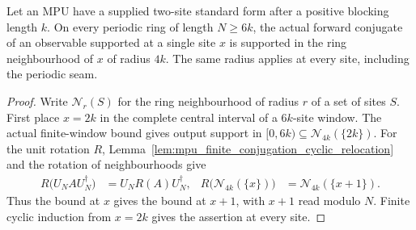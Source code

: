 \begin{lemma}
    \label{lem:mpu_finite_cyclic_singleton_propagation}
    \leanok
    Let an MPU have a supplied two-site standard form after a positive
    blocking length $k$. On every periodic ring of length $N\geq 6k$,
    the actual forward conjugate of an observable supported at a single
    site $x$ is supported in the ring neighbourhood of $x$ of radius $4k$.
    The same radius applies at every site, including the periodic seam.
\end{lemma}
\begin{proof}\leanok
    Write $\mathcal N_r(S)$ for the ring neighbourhood of radius $r$ of
    a set of sites $S$. First place $x=2k$ in the complete central
    interval of a $6k$-site window. The actual finite-window bound gives
    output support in $[0,6k)\subseteq\mathcal N_{4k}(\{2k\})$. For
    the unit rotation $R$, Lemma~\ref{lem:mpu_finite_conjugation_cyclic_relocation}
    and the rotation of neighbourhoods give
    \begin{align}
        R\bigl(U_NAU_N^\dagger\bigr)        & =U_NR(A)U_N^\dagger,       &
        R\bigl(\mathcal N_{4k}(\{x\})\bigr) & =\mathcal N_{4k}(\{x+1\}).
    \end{align}
    Thus the bound at $x$ gives the bound at $x+1$, with $x+1$ read
    modulo $N$. Finite cyclic induction from $x=2k$ gives the assertion
    at every site.
\end{proof}

